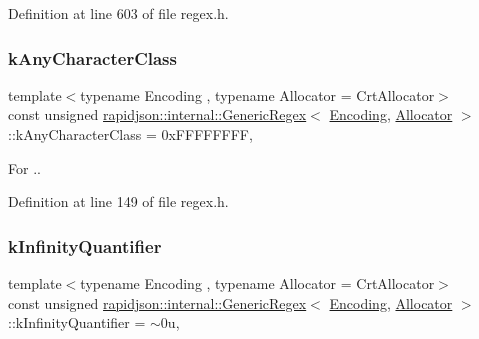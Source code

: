 Definition at line 603 of file regex.\+h.

\mbox{\label{classrapidjson_1_1internal_1_1_generic_regex_a2ee5fdb29d3092832aad021e5f5e383b}} 
\subsubsection{\texorpdfstring{kAnyCharacterClass}{kAnyCharacterClass}}
{\footnotesize\ttfamily template$<$typename Encoding , typename Allocator  = Crt\+Allocator$>$ \\
const unsigned \mbox{\hyperlink{classrapidjson_1_1internal_1_1_generic_regex}{rapidjson\+::internal\+::\+Generic\+Regex}}$<$ \mbox{\hyperlink{classrapidjson_1_1_encoding}{Encoding}}, \mbox{\hyperlink{classrapidjson_1_1_allocator}{Allocator}} $>$\+::k\+Any\+Character\+Class = 0x\+F\+F\+F\+F\+F\+F\+FF\hspace{0.3cm}{\ttfamily [static]}, {\ttfamily [private]}}



For \textquotesingle{}.\textquotesingle{}. 



Definition at line 149 of file regex.\+h.

\mbox{\label{classrapidjson_1_1internal_1_1_generic_regex_a1fa843a0465589454b91bec76518bf95}} 
\subsubsection{\texorpdfstring{kInfinityQuantifier}{kInfinityQuantifier}}
{\footnotesize\ttfamily template$<$typename Encoding , typename Allocator  = Crt\+Allocator$>$ \\
const unsigned \mbox{\hyperlink{classrapidjson_1_1internal_1_1_generic_regex}{rapidjson\+::internal\+::\+Generic\+Regex}}$<$ \mbox{\hyperlink{classrapidjson_1_1_encoding}{Encoding}}, \mbox{\hyperlink{classrapidjson_1_1_allocator}{Allocator}} $>$\+::k\+Infinity\+Quantifier = $\sim$0u\hspace{0.3cm}{\ttfamily [static]}, {\ttfamily [private]}}



